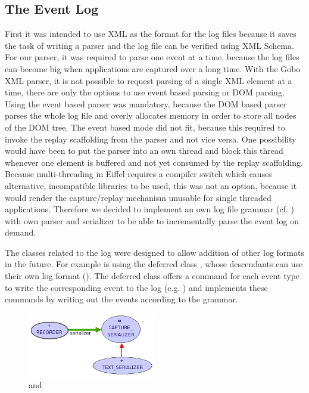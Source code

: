 \subsection{The Event Log}
First it was intended to use XML as the format for the log files because it saves the task of writing a parser and the log file can be verified using XML Schema. For our parser, it was required to parse one event at a time, because the log files can become big when applications are captured over a long time. With the Gobo XML parser, it is not possible to request parsing of a single XML element at a time, there are only the options to use event based parsing or DOM parsing. Using the event based parser was mandatory, because the DOM based parser parses the whole log file and overly allocates memory in order to store all nodes of the DOM tree. The event based mode did not fit, because this required to invoke the replay scaffolding from the parser and not vice versa. One possibility would have been to put the parser into an own thread and block this thread whenever one element is buffered and not yet consumed by the replay scaffolding. Because multi-threading in Eiffel requires a compiler switch which causes alternative, incompatible libraries to be used, this was not an option, because it would render the capture/replay mechanism unusable for single threaded applications.
Therefore we decided to implement an own log file grammar (cf. ) with own parser and serializer to be able to incrementally parse the event log on demand.


The classes related to the log were designed to allow addition of other log formats in the future. For example  is using the deferred class , whose descendants can use their own log format (). The deferred class offers a command for each event type to write the corresponding event to the log (e.g. ) and  implements these commands by writing out the events according to the grammar.

\begin{figure}[ht]
  \centering
  \includegraphics[width=0.5\textwidth]{illustrations/implementation_serializer.png}
  \caption{ and }
  \label{fig:implementation_serializer}
\end{figure}

